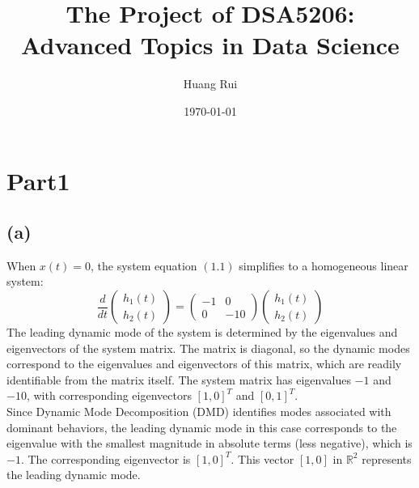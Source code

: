 \documentclass[12pt]{article}
\title{The Project of DSA5206: Advanced Topics in Data Science}
\author{Huang Rui}
\date{\today}
\begin{document}
\maketitle

\section*{Part1}
\subsection*{(a)}
When $x(t)=0$, the system equation $(1.1)$ simplifies to a homogeneous linear system:
\[
\frac{d}{dt}
\begin{pmatrix}
h_1(t) \\
h_2(t)
\end{pmatrix}
=
\begin{pmatrix}
-1 & 0 \\
0 & -10
\end{pmatrix}
\begin{pmatrix}
h_1(t) \\
h_2(t)
\end{pmatrix}
\]
The leading dynamic mode of the system is determined by the eigenvalues and eigenvectors of the system matrix. The matrix is diagonal, so the dynamic modes correspond to the eigenvalues and eigenvectors of this matrix, which are readily identifiable from the matrix itself. The system matrix has eigenvalues $-1$ and $-10$, with corresponding eigenvectors $[1,0]^T$ and $[0,1]^T$.\\

Since Dynamic Mode Decomposition (DMD) identifies modes associated with dominant behaviors, the leading dynamic mode in this case corresponds to the eigenvalue with the smallest magnitude in absolute terms (less negative), which is $-1$. The corresponding eigenvector is $[1,0]^T$. This vector $[1,0]$ in $ \mathbb{R}^2 $ represents the leading dynamic mode.\\
\end{document}
